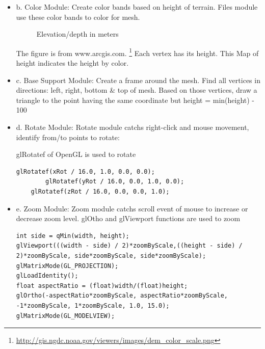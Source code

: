 \documentclass[11pt]{article}
\begin{document}
\begin{itemize}
\item b. Color Module:
Create color bands based on height of terrain. Files module use these color bands to color for mesh.
\begin{figure}[H] 
  \caption{Elevation/depth in meters}
\end{figure}
The figure is from www.arcgis.com. \footnote{\url{http://gis.ngdc.noaa.gov/viewers/images/dem_color_scale.png}}
Each vertex has its height. This Map of height indicates the height by color.

\item c. Base Support Module:
Create a frame around the mesh.
Find all vertices in directions: left, right, bottom \& top of mesh. Based on those vertices, draw a triangle to the point having the same coordinate but height = min(height) - 100

\item d. Rotate Module:
Rotate module catchs right-click and mouse movement, identify from/to points to rotate:

glRotatef of OpenGL is used to rotate
\begin{lstlisting}
glRotatef(xRot / 16.0, 1.0, 0.0, 0.0);
    	glRotatef(yRot / 16.0, 0.0, 1.0, 0.0);
    glRotatef(zRot / 16.0, 0.0, 0.0, 1.0);
\end{lstlisting}

\item e. Zoom Module:
Zoom module catchs scroll event of mouse to increase or decrease zoom level.
glOtho and glViewport functions are used to zoom
\begin{lstlisting}[breaklines=true]
int side = qMin(width, height);
glViewport(((width - side) / 2)*zoomByScale,((height - side) / 2)*zoomByScale, side*zoomByScale, side*zoomByScale);
glMatrixMode(GL_PROJECTION);
glLoadIdentity();
float aspectRatio = (float)width/(float)height;
glOrtho(-aspectRatio*zoomByScale, aspectRatio*zoomByScale, -1*zoomByScale, 1*zoomByScale, 1.0, 15.0);
glMatrixMode(GL_MODELVIEW);
\end{lstlisting}


\end{itemize}
\end{document}
